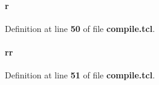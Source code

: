 \paragraph[{r}]{\setlength{\rightskip}{0pt plus 5cm}r}\label{rx__path__top_2smpl__cmp_2compile_8tcl_a514f1b439f404f86f77090fa9edc96ce}


Definition at line {\bf 50} of file {\bf compile.\+tcl}.

\paragraph[{rr}]{\setlength{\rightskip}{0pt plus 5cm}rr}\label{rx__path__top_2smpl__cmp_2compile_8tcl_aeb9279982226a42afdf2860dbdc29b45}


Definition at line {\bf 51} of file {\bf compile.\+tcl}.

